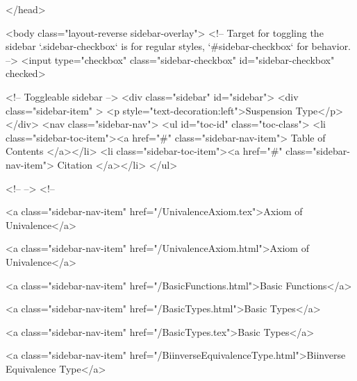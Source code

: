   
</head>




  <body class="layout-reverse sidebar-overlay">
    <!-- Target for toggling the sidebar `.sidebar-checkbox` is for regular
     styles, `#sidebar-checkbox` for behavior. -->
<input type="checkbox" class="sidebar-checkbox" id="sidebar-checkbox" checked>

<!-- Toggleable sidebar -->
<div class="sidebar" id="sidebar">
  <div class="sidebar-item" >
    <p style="text-decoration:left">Suspension Type</p>
  </div>
  <nav class="sidebar-nav">
    <ul id="toc-id" class="toc-class">
  <li class="sidebar-toc-item"><a href="#" class="sidebar-nav-item"> Table of Contents </a></li>
  <li class="sidebar-toc-item"><a href="#" class="sidebar-nav-item"> Citation </a></li>
</ul>


    <!--  -->
    <!-- 
      
    
      
    
      
    
      
    
      
        
      
    
      
        
          <a class="sidebar-nav-item" href="/UnivalenceAxiom.tex">Axiom of Univalence</a>
        
      
    
      
        
          <a class="sidebar-nav-item" href="/UnivalenceAxiom.html">Axiom of Univalence</a>
        
      
    
      
        
          <a class="sidebar-nav-item" href="/BasicFunctions.html">Basic Functions</a>
        
      
    
      
        
          <a class="sidebar-nav-item" href="/BasicTypes.html">Basic Types</a>
        
      
    
      
        
          <a class="sidebar-nav-item" href="/BasicTypes.tex">Basic Types</a>
        
      
    
      
        
          <a class="sidebar-nav-item" href="/BiinverseEquivalenceType.html">Biinverse Equivalence Type</a>
        
